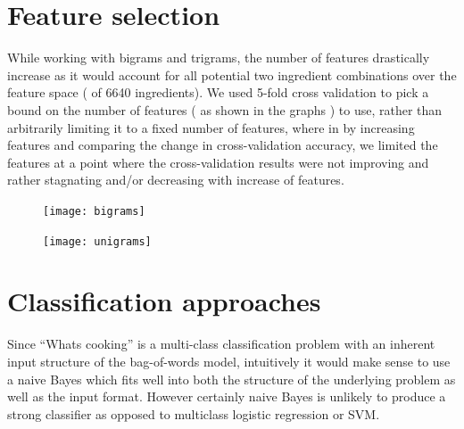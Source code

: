 \documentclass[prodmode,acmtap]{acmlarge}
\begin{document}
\section{Feature selection}
While working with bigrams and trigrams, the number of features drastically increase as it would account for all potential two ingredient combinations over the feature space ( of 6640 ingredients). 
We used 5-fold cross validation to pick a bound on the number of features ( as shown in the graphs ) to use, rather than arbitrarily limiting it to a fixed number of features, where in by increasing features and comparing the change in cross-validation accuracy, we limited the features at a point where the cross-validation results were not improving and rather stagnating and/or decreasing with increase of features.




\begin{figure}
\centering
\begin{minipage}{.45\textwidth}
  \centering
  \texttt{[image: bigrams]}
  \label{bigrams}
\end{minipage}%
\hfill
\begin{minipage}{.45\textwidth}
  \centering
  \texttt{[image: unigrams]}
  \label{unigrams}
\end{minipage}
\end{figure}





\section{Classification approaches}
Since ``What\textquotesingle s cooking'' is a multi-class classification problem with an inherent input structure of the bag-of-words model, intuitively it would make sense to use a naive Bayes which fits well into both the structure of the underlying problem as well as the input format. However certainly naive Bayes is unlikely to produce a strong classifier as opposed to multiclass logistic regression or SVM.
\end{document}
